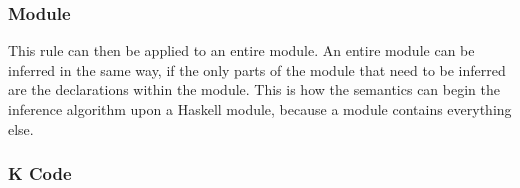 \subsubsection{Module}

This rule can then be applied to an entire module. An entire module can be inferred in the same way, if the only parts of the module that need to be inferred are the declarations within the module. This is how the semantics can begin the inference algorithm upon a Haskell module, because a module contains everything else.

\begin{prooftree}
\end{prooftree}

\subsubsection{K Code}

